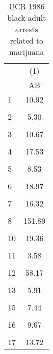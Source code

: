 \begin{table}[H]\centering
\caption{UCR 1986 black adult arrests related to marijuana }
\begin{tabular}{l*{1}{c}}
\hline\hline
                    &\multicolumn{1}{c}{(1)}\\
                    &\multicolumn{1}{c}{AB}\\
\hline
1                   &       10.92\\
                    &            \\
[1em]
2                   &        5.30\\
                    &            \\
[1em]
3                   &       10.67\\
                    &            \\
[1em]
4                   &       17.53\\
                    &            \\
[1em]
5                   &        8.53\\
                    &            \\
[1em]
6                   &       18.97\\
                    &            \\
[1em]
7                   &       16.32\\
                    &            \\
[1em]
8                   &      151.89\\
                    &            \\
[1em]
10                  &       19.36\\
                    &            \\
[1em]
11                  &        3.58\\
                    &            \\
[1em]
12                  &       58.17\\
                    &            \\
[1em]
13                  &        5.91\\
                    &            \\
[1em]
15                  &        7.44\\
                    &            \\
[1em]
16                  &        9.67\\
                    &            \\
[1em]
17                  &       13.72\\

\end{tabular}
\end{table}
